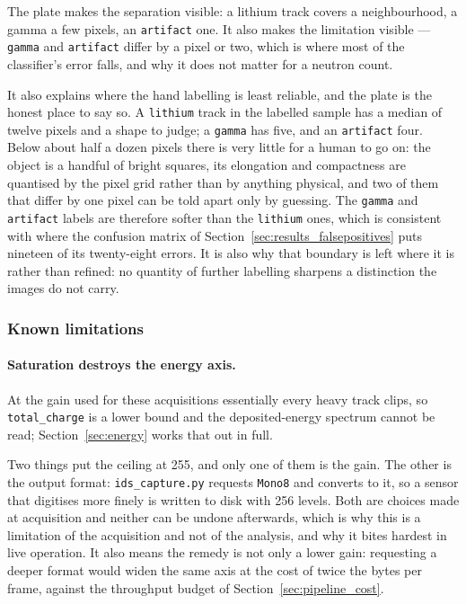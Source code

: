 \documentclass[a4paper,headsepline,oneside,11pt]{scrartcl}
\begin{document}
The plate makes the separation visible: a lithium track covers a neighbourhood,
a gamma a few pixels, an \texttt{artifact} one. It also makes the limitation visible ---
\texttt{gamma} and \texttt{artifact} differ by a pixel or two, which is where
most of the classifier's error falls, and why it does not matter for a neutron
count.

It also explains where the hand labelling is least reliable, and the plate is
the honest place to say so. A \texttt{lithium} track in the labelled sample has
a median of twelve pixels and a shape to judge; a \texttt{gamma} has five, and
an \texttt{artifact} four. Below about half a dozen pixels there is very little
for a human to go on: the object is a handful of bright squares, its elongation
and compactness are quantised by the pixel grid rather than by anything
physical, and two of them that differ by one pixel can be told apart only by
guessing. The \texttt{gamma} and \texttt{artifact} labels are therefore softer
than the \texttt{lithium} ones, which is consistent with where the confusion
matrix of Section~\ref{sec:results_falsepositives} puts nineteen of its
twenty-eight errors. It is also why that boundary is left where it is rather
than refined: no quantity of further labelling sharpens a distinction the images
do not carry.

\subsubsection{Known limitations}

\paragraph{Saturation destroys the energy axis.} At the gain used for these
acquisitions essentially every heavy track clips, so \texttt{total\_charge} is a
lower bound and the deposited-energy spectrum cannot be read;
Section~\ref{sec:energy} works that out in full.

Two things put the ceiling at 255, and only one of them is the gain. The other
is the output format: \texttt{ids\_capture.py} requests \texttt{Mono8} and
converts to it, so a sensor that digitises more finely is written to disk with
\num{256} levels. Both are choices made at acquisition and neither can be undone
afterwards, which is why this is a limitation of the acquisition and not of the
analysis, and why it bites hardest in live operation. It also means the remedy
is not only a lower gain: requesting a deeper format would widen the same axis
at the cost of twice the bytes per frame, against the throughput budget of
Section~\ref{sec:pipeline_cost}.
\end{document}
